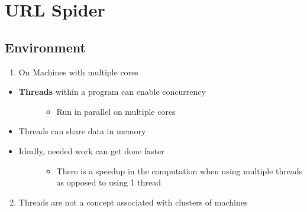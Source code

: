 \documentclass[letterpaper,10pt,openany,oneside]{sphinxmanual}
\begin{document}
\chapter{URL Spider}
\label{URLSpider/URLSpider::doc}\label{URLSpider/URLSpider:url-spider}

\section{Environment}
\label{URLSpider/URLSpider:environment}\begin{enumerate}
\item {} 
On Machines with multiple cores

\end{enumerate}
\begin{itemize}
\item {} \begin{description}
\item[{\textbf{Threads} within a program can enable concurrency}] \leavevmode\begin{itemize}
\item {} 
Run in parallel on multiple cores

\end{itemize}

\end{description}

\item {} 
Threads can share data in memory

\item {} \begin{description}
\item[{Ideally, needed work can get done faster}] \leavevmode\begin{itemize}
\item {} 
There is a speedup in the computation when using multiple threads as opposed to using 1 thread

\end{itemize}

\end{description}

\end{itemize}
\begin{enumerate}
\setcounter{enumi}{1}
\item {} 
Threads are not a concept associated with clusters of machines

\end{enumerate}
\end{document}
